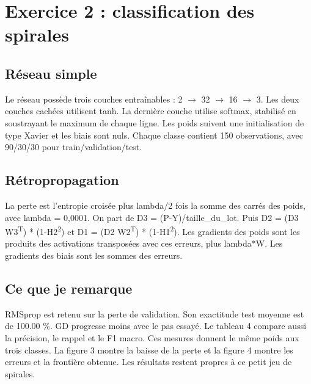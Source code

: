 \documentclass[10pt,a4paper]{article}
\begin{document}
\newpage
\section*{Exercice 2 : classification des spirales}
\subsection*{Réseau simple}
Le réseau possède trois couches entraînables : 2 $\rightarrow$ 32 $\rightarrow$ 16 $\rightarrow$ 3. Les deux couches cachées utilisent tanh. La dernière couche utilise softmax, stabilisé en soustrayant le maximum de chaque ligne. Les poids suivent une initialisation de type Xavier et les biais sont nuls. Chaque classe contient 150 observations, avec 90/30/30 pour train/validation/test.

\subsection*{Rétropropagation}
La perte est l’entropie croisée plus lambda/2 fois la somme des carrés des poids, avec lambda = 0,0001. On part de D3 = (P-Y)/taille\_du\_lot. Puis D2 = (D3 W3\textsuperscript{T}) * (1-H2\textsuperscript{2}) et D1 = (D2 W2\textsuperscript{T}) * (1-H1\textsuperscript{2}). Les gradients des poids sont les produits des activations transposées avec ces erreurs, plus lambda*W. Les gradients des biais sont les sommes des erreurs.

\subsection*{Ce que je remarque}
RMSprop est retenu sur la perte de validation. Son exactitude test moyenne est de 100.00 \%. GD progresse moins avec le pas essayé. Le tableau 4 compare aussi la précision, le rappel et le F1 macro. Ces mesures donnent le même poids aux trois classes. La figure 3 montre la baisse de la perte et la figure 4 montre les erreurs et la frontière obtenue. Les résultats restent propres à ce petit jeu de spirales.
\end{document}
